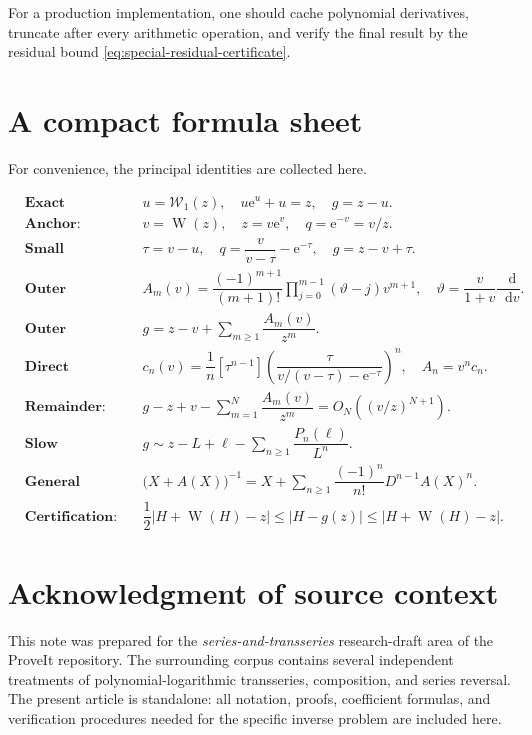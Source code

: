 \documentclass[11pt,oneside]{article}
\theoremstyle{plain}
\theoremstyle{definition}
\theoremstyle{remark}
\newcommand{\W}{\operatorname{W}}
\newcommand{\rW}{\mathcal{W}}
\newcommand{\e}{\mathrm{e}}
\newcommand{\dd}{\mathop{}\!\mathrm{d}}
\begin{document}
For a production implementation, one should cache polynomial derivatives,
truncate after every arithmetic operation, and verify the final result by the
residual bound \eqref{eq:special-residual-certificate}.

\section{A compact formula sheet}
\label{app:formula-sheet}

For convenience, the principal identities are collected here.

\begin{align*}
&\textbf{Exact reduction:}
&&u=\rW_1(z),\quad u\e^u+u=z,\quad g=z-u.\\[0.4em]
&\textbf{Anchor:}
&&v=\W(z),\quad z=v\e^v,\quad q=\e^{-v}=v/z.\\[0.4em]
&\textbf{Small displacement:}
&&\tau=v-u,\quad q=\dfrac{v}{v-\tau}-\e^{-\tau},\quad g=z-v+\tau.\\[0.4em]
&\textbf{Outer coefficient:}
&&A_m(v)=\dfrac{(-1)^{m+1}}{(m+1)!}
  \prod_{j=0}^{m-1}(\vartheta-j)v^{m+1},
  \quad \vartheta=\dfrac{v}{1+v}\dfrac{\dd}{\dd v}.\\[0.4em]
&\textbf{Outer expansion:}
&&g=z-v+\displaystyle\sum_{m\ge1}\dfrac{A_m(v)}{z^m}.\\[0.4em]
&\textbf{Direct inverse coefficient:}
&&c_n(v)=\dfrac1n[\tau^{n-1}]
  \left(\dfrac{\tau}{v/(v-\tau)-\e^{-\tau}}\right)^n,
  \quad A_n=v^nc_n.\\[0.4em]
&\textbf{Remainder:}
&&g-z+v-\displaystyle\sum_{m=1}^{N}\dfrac{A_m(v)}{z^m}
  =O_N\!\left((v/z)^{N+1}\right).\\[0.4em]
&\textbf{Slow expansion:}
&&g\sim z-L+\ell-\displaystyle\sum_{n\ge1}\dfrac{P_n(\ell)}{L^n}.\\[0.4em]
&\textbf{General reversion:}
&&\bigl(X+A(X)\bigr)^{-1}
  =X+\displaystyle\sum_{n\ge1}\dfrac{(-1)^n}{n!}D^{n-1}A(X)^n.\\[0.4em]
&\textbf{Certification:}
&&\dfrac12|H+\W(H)-z|\le|H-g(z)|\le|H+\W(H)-z|.
\end{align*}

\section*{Acknowledgment of source context}

This note was prepared for the
\emph{series-and-transseries} research-draft area of the ProveIt repository.
The surrounding corpus contains several independent treatments of
polynomial-logarithmic transseries, composition, and series reversal.  The
present article is standalone: all notation, proofs, coefficient formulas, and
verification procedures needed for the specific inverse problem are included
here.
\end{document}
